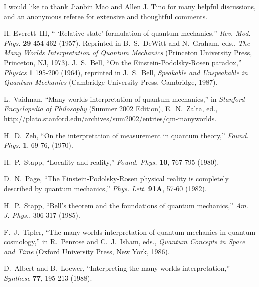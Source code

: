 \documentclass[12pt]{article}
\begin{document}
{I would like to thank Jianbin Mao and Allen J. Tino for many helpful discussions, and an anonymous referee for
extensive and thoughtful comments.















\begin{thebibliography}{99}

H. Everett~III, `` `Relative state' formulation of quantum 
mechanics,'' {\em Rev. Mod. Phys.}\/ {\bf 29}  454-462 (1957). Reprinted in B.~S.~DeWitt and
N.~Graham, eds., {\em The Many Worlds Interpretation of Quantum Mechanics}
(Princeton University Press, Princeton, NJ, 1973). 
%
 J.~S.~Bell, ``On the Einstein-Podolsky-Rosen paradox,''
{\em Physics}\/ {\bf 1} 195-200   (1964), reprinted in J.~S.~Bell, {\em Speakable
and Unspeakable in Quantum Mechanics}\/ (Cambridge University Press, Cambridge, 1987).




L.~Vaidman, ``Many-worlds interpretation of quantum mechanics,'' in {\em Stanford Encyclopedia of Philosophy}\/ (Summer 2002 Edition), E.~N.~Zalta, ed., http://plato.stanford.edu/archives/sum2002/entries/qm-manyworlds.


H.~D.~Zeh, ``On the interpretation of measurement in quantum theory,''
{\em Found. Phys.}\/ {\bf 1}, 69-76, (1970).



H.~P.~Stapp, ``Locality and reality,'' {\em Found. Phys.}\/ {\bf 10}, 
767-795 (1980).

D.~N.~Page, ``The Einstein-Podolsky-Rosen physical reality is completely
described by quantum mechanics,'' {\em Phys. Lett. }\/ {\bf 91A}, 57-60  (1982).  



H.~P.~Stapp, ``Bell's theorem and the foundations of quantum mechanics,''
{\em Am. J. Phys.}, 306-317 (1985).

  F.~J.~Tipler,    ``The many-worlds interpretation of quantum mechanics in quantum cosmology,'' in R.~Penrose and C.~J.~Isham, eds., {\em Quantum Concepts in Space and
Time}\/ (Oxford University Press, New York, 1986). 

 D.~Albert and B.~Loewer,   ``Interpreting the many worlds interpretation,''
{\em Synthese}\/ {\bf 77}, 195-213 (1988).


\end{thebibliography}}
\end{document}
